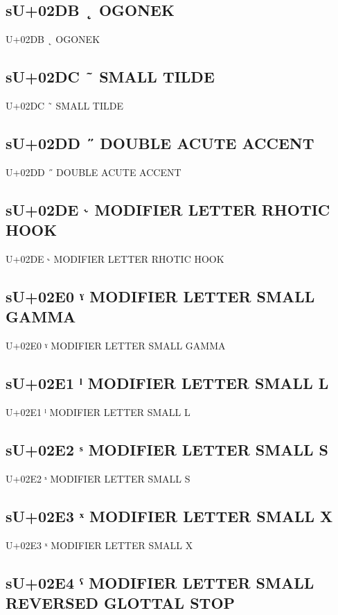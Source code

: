 \subsection{sU+02DB ˛ OGONEK}

U+02DB ˛ OGONEK

\subsection{sU+02DC ˜  SMALL TILDE}

U+02DC ˜  SMALL TILDE

\subsection{sU+02DD ˝  DOUBLE ACUTE ACCENT}

U+02DD ˝  DOUBLE ACUTE ACCENT

\subsection{sU+02DE ˞ MODIFIER LETTER RHOTIC HOOK}

U+02DE ˞ MODIFIER LETTER RHOTIC HOOK

\subsection{sU+02E0 ˠ MODIFIER LETTER SMALL GAMMA}

U+02E0 ˠ MODIFIER LETTER SMALL GAMMA

\subsection{sU+02E1 ˡ MODIFIER LETTER SMALL L}

U+02E1 ˡ MODIFIER LETTER SMALL L

\subsection{sU+02E2 ˢ MODIFIER LETTER SMALL S}

U+02E2 ˢ MODIFIER LETTER SMALL S

\subsection{sU+02E3 ˣ MODIFIER LETTER SMALL X}

U+02E3 ˣ MODIFIER LETTER SMALL X

\subsection{sU+02E4 ˤ MODIFIER LETTER SMALL REVERSED GLOTTAL STOP}

